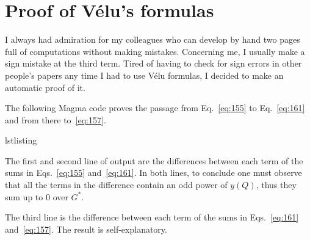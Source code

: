\chapter{Proof of Vélu's formulas}
\label{cha:proof-velus-formulas}

I always had admiration for my colleagues who can develop by hand two
pages full of computations without making mistakes. Concerning me, I
usually make a sign mistake at the third term. Tired of having to
check for sign errors in other people's papers any time I had to use
Vélu formulas, I decided to make an automatic proof of it.

The following Magma code proves the passage from Eq.~\eqref{eq:155} to
Eq.~\eqref{eq:161} and from there to~\eqref{eq:157}.

\begin{xcomment}{lstlisting}

\end{xcomment}

The first and second line of output are the differences between each
term of the sums in Eqs.~\eqref{eq:155} and~\eqref{eq:161}. In both
lines, to conclude one must observe that all the terms in the
difference contain an odd power of $y(Q)$, thus they sum up to $0$
over $G^\ast$.

The third line is the difference between each term of the sums in
Eqs.~\eqref{eq:161} and~\eqref{eq:157}. The result is
self-explanatory.


